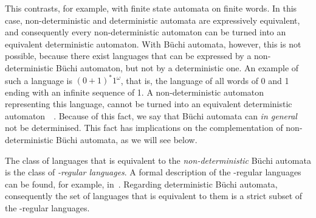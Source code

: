 This contrasts, for example, with finite state automata on finite words. In this case, non-deterministic and deterministic automata are expressively equivalent, and consequently every non-deterministic automaton can be turned into an equivalent deterministic automaton. With Büchi automata, however, this is not possible, because there exist languages that can be expressed by a non-deterministic Büchi automaton, but not by a deterministic one. An example of such a language is $(0+1)^*1^\omega$, that is, the language of all words of 0 and 1 ending with an infinite sequence of 1. A non-deterministic automaton representing this language, cannot be turned into an equivalent deterministic automaton~~\cite{1996_vardi, 2002_roggenbach}. Because of this fact, we say that Büchi automata can \textit{in general} not be determinised. This fact has implications on the complementation of non-deterministic Büchi automata, as we will see below.

The class of languages that is equivalent to the \textit{non-deterministic} Büchi automata is the class of \textit{\om-regular languages}. A formal description of the \om-regular languages can be found, for example, in~\cite{Thomas:1991,1996_thomas,2014_wilke}. Regarding deterministic Büchi automata, consequently the set of languages that is equivalent to them is a strict subset of the \om-regular languages.




